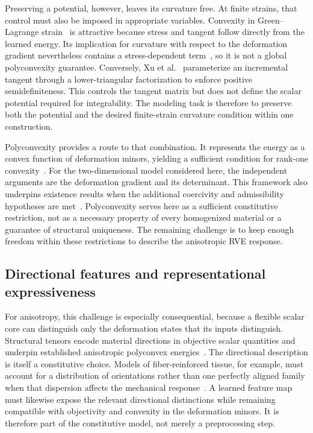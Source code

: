 Preserving a potential, however, leaves its curvature free. At finite strains, that control must also be imposed in appropriate variables. Convexity in Green--Lagrange strain~\cite{asad2022} is attractive because stress and tangent follow directly from the learned energy. Its implication for curvature with respect to the deformation gradient nevertheless contains a stress-dependent term~\cite{GaoNeffRoventaThiel2017}, so it is not a global polyconvexity guarantee. Conversely, Xu et al.~\cite{Xu2021} parameterize an incremental tangent through a lower-triangular factorization to enforce positive semidefiniteness. This controls the tangent matrix but does not define the scalar potential required for integrability. The modeling task is therefore to preserve both the potential and the desired finite-strain curvature condition within one construction.

Polyconvexity provides a route to that combination. It represents the energy as a convex function of deformation minors, yielding a sufficient condition for rank-one convexity~\cite{ball1977}. For the two-dimensional model considered here, the independent arguments are the deformation gradient and its determinant. This framework also underpins existence results when the additional coercivity and admissibility hypotheses are met~\cite{Ciarlet1988}. Polyconvexity serves here as a sufficient constitutive restriction, not as a necessary property of every homogenized material or a guarantee of structural uniqueness. The remaining challenge is to keep enough freedom within these restrictions to describe the anisotropic RVE response.

\subsection{Directional features and representational expressiveness}
\label{sec:discussion}
For anisotropy, this challenge is especially consequential, because a flexible scalar core can distinguish only the deformation states that its inputs distinguish. Structural tensors encode material directions in objective scalar quantities and underpin established anisotropic polyconvex energies~\cite{SchroderNeff2003}. The directional description is itself a constitutive choice. Models of fiber-reinforced tissue, for example, must account for a distribution of orientations rather than one perfectly aligned family when that dispersion affects the mechanical response~\cite{Gasser2006}. A learned feature map must likewise expose the relevant directional distinctions while remaining compatible with objectivity and convexity in the deformation minors. It is therefore part of the constitutive model, not merely a preprocessing step.

